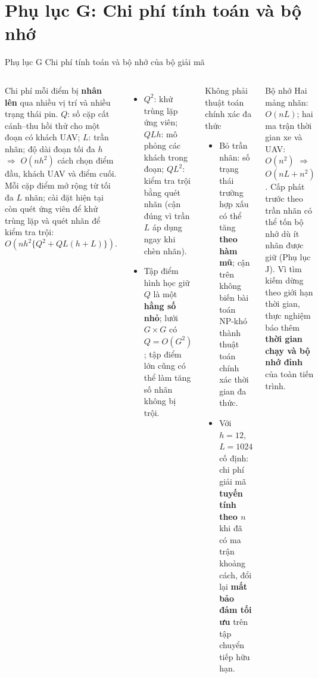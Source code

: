 \documentclass[aspectratio=169,10pt,t,xcolor={table}]{beamer}
\newcommand{\apptitle}[2]{Phụ lục #1 \textperiodcentered{} #2}
\begin{document}
\section{Phụ lục G: Chi phí tính toán và bộ nhớ}

\begin{frame}[label=appG]{\apptitle{G}{Chi phí tính toán và bộ nhớ của bộ giải mã}}
\begin{columns}[T,onlytextwidth]
\scriptsize Chi phí mỗi điểm bị \textbf{nhân lên} qua nhiều vị trí và nhiều trạng thái pin. $Q$: số cặp cất cánh--thu hồi thử cho một đoạn có khách UAV; $L$: trần nhãn; độ dài đoạn tối đa $h$ $\Rightarrow$ $O(nh^2)$ cách chọn điểm đầu, khách UAV và điểm cuối. Mỗi cặp điểm mở rộng từ tối đa $L$ nhãn; cài đặt hiện tại còn quét ứng viên để khử trùng lặp và quét nhãn để kiểm tra trội:
\[
O\!\left(nh^2\{Q^2+QL(h+L)\}\right).
\]
\begin{itemize}
\item $Q^2$: khử trùng lặp ứng viên; $QLh$: mô phỏng các khách trong đoạn; $QL^2$: kiểm tra trội bằng quét nhãn (cận đúng vì trần $L$ áp dụng ngay khi chèn nhãn).
\item Tập điểm hình học giữ $Q$ là một \textbf{hằng số nhỏ}; lưới $G\times G$ có $Q=O(G^2)$; tập điểm lớn cũng có thể làm tăng số nhãn không bị trội.
\end{itemize}
\begin{alertblock}{Không phải thuật toán chính xác đa thức}
\scriptsize
\begin{itemize}
\item Bỏ trần nhãn: số trạng thái trường hợp xấu có thể tăng \textbf{theo hàm mũ}; cận trên không biến bài toán NP-khó thành thuật toán chính xác thời gian đa thức.
\item Với $h=12$, $L=1024$ cố định: chi phí giải mã \textbf{tuyến tính theo $n$} khi đã có ma trận khoảng cách, đổi lại \textbf{mất bảo đảm tối ưu} trên tập chuyển tiếp hữu hạn.
\end{itemize}
\end{alertblock}
\begin{block}{Bộ nhớ}
\scriptsize Hai mảng nhãn: $O(nL)$; hai ma trận thời gian xe và UAV: $O(n^2)$ $\Rightarrow$ $O(nL+n^2)$. Cấp phát trước theo trần nhãn có thể tốn bộ nhớ dù ít nhãn được giữ (Phụ lục J). Vì tìm kiếm dừng theo giới hạn thời gian, thực nghiệm báo thêm \textbf{thời gian chạy và bộ nhớ đỉnh} của toàn tiến trình.
\end{block}
\end{columns}
\end{frame}
\end{document}
